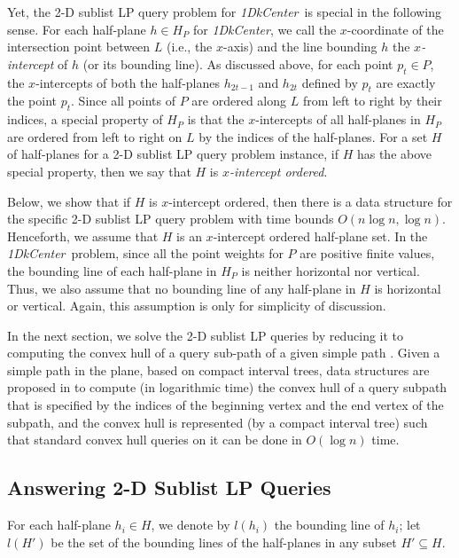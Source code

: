 \documentclass{llncs}
\def\problem{{\it 1DkCenter}}
\begin{document}
Yet, the 2-D sublist LP query problem for
\problem\ is special in the
following sense. For each half-plane $h\in H_P$ for \problem, we call the
$x$-coordinate of the intersection point between $L$ (i.e., the $x$-axis)
and the line bounding $h$ the {\em $x$-intercept} of $h$
(or its bounding line). As discussed above, for each
point $p_t\in P$, the $x$-intercepts of both the half-planes $h_{2t-1}$
and $h_{2t}$ defined by $p_t$ are exactly the point $p_t$. Since all
points of $P$ are ordered along $L$ from left to right by their
indices, a special property of $H_P$ is that the $x$-intercepts of
all half-planes in $H_P$ are ordered from left to right on $L$ by
the indices of the half-planes. For a set $H$ of half-planes for a
2-D sublist LP query problem instance, if $H$ has the above special property,
then we say that $H$ is {\em $x$-intercept ordered}.


Below, we show that if $H$ is $x$-intercept ordered, then there is a
data structure for the specific 2-D sublist LP query problem with time
bounds $O(n\log n, \log n)$.
Henceforth, we assume that $H$ is an $x$-intercept ordered half-plane
set. In the \problem\ problem, since all the point weights for $P$
are positive finite values, the bounding line of each half-plane in
$H_P$ is neither horizontal nor vertical. Thus, we also assume that
no bounding line of any half-plane in $H$ is horizontal
or vertical. Again, this assumption is only for simplicity of discussion.


In the next section, we solve the 2-D sublist LP queries by reducing
it to computing the convex hull of a query sub-path of a given simple
path \cite{ref:GuibasCo91}.
Given a simple path in the plane, based on
compact interval trees, data structures are proposed in
\cite{ref:GuibasCo91} to compute (in logarithmic time)
the convex hull of a query subpath
that is specified by the indices of the beginning vertex and the end
vertex of the subpath, and the convex hull is represented
(by a compact interval tree) such that standard convex hull
queries on it can be done in $O(\log n)$ time.

\subsection{Answering 2-D Sublist LP Queries}


For each half-plane $h_i\in H$, we denote by $l(h_i)$ the
bounding line of $h_i$; let $l(H')$ be the set of the bounding lines of
the half-planes in any subset $H'\subseteq H$.
\end{document}
